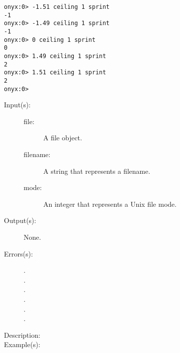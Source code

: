 \begin{description}
\begin{description}
\begin{verbatim}
onyx:0> -1.51 ceiling 1 sprint
-1
onyx:0> -1.49 ceiling 1 sprint
-1
onyx:0> 0 ceiling 1 sprint
0
onyx:0> 1.49 ceiling 1 sprint
2
onyx:0> 1.51 ceiling 1 sprint
2
onyx:0>
		\end{verbatim}
	\end{description}
\label{systemdict:chmod}
\item[{\onyxop{file/filename mode}{chmod}{--}}: ]
	\begin{description}\item[]
	\item[Input(s): ]
		\begin{description}\item[]
		\item[file: ]
			A file object.
		\item[filename: ]
			A string that represents a filename.
		\item[mode: ]
			An integer that represents a Unix file mode.
		\end{description}
	\item[Output(s): ] None.
	\item[Errors(s): ]
		\begin{description}\item[]
		\item[.]
		\item[.]
		\item[.]
		\item[.]
		\item[.]
		\item[.]
		\end{description}
	\item[Description: ]
	\item[Example(s): ]\begin{verbatim}


\end{verbatim}
\end{description}
\end{description}
